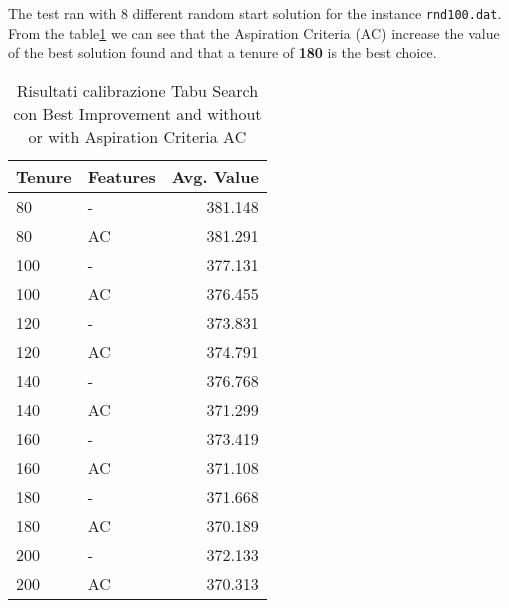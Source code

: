 	The test ran with 8 different random start solution for the instance \verb|rnd100.dat|. From the table\ref{tab:TS-calibration} we can see that the Aspiration Criteria (AC) increase the value of the best solution found and that a tenure of \textbf{180} is the best choice.
	
	\begin{table}
		\centering
		\begin{tabular} {l l r}
			\toprule
			Tenure & Features & Avg. Value \\
			\midrule
			 80 & -  & 381.148  \\
			 80 & AC & 381.291 \\
			\midrule
			 100 & - & 377.131 \\
			 100 & AC & 376.455 \\
			\midrule
			 120 & - & 373.831 \\
			 120 & AC & 374.791 \\
			\midrule
			 140 & - & 376.768 \\
			 140 & AC &371.299 \\
			\midrule
			 160 & - & 373.419 \\
			 160 & AC & 371.108 \\
			\midrule
			 180 & - & 371.668 \\
			 180 & AC & 370.189 \\
			\midrule
			 200 & - & 372.133 \\
			 200 & AC & 370.313  \\
			\bottomrule
		\end{tabular}
		\caption{\label{tab:TS-calibration}Risultati calibrazione Tabu Search con Best Improvement and without or with Aspiration Criteria AC}
	\end{table}
	
	



	